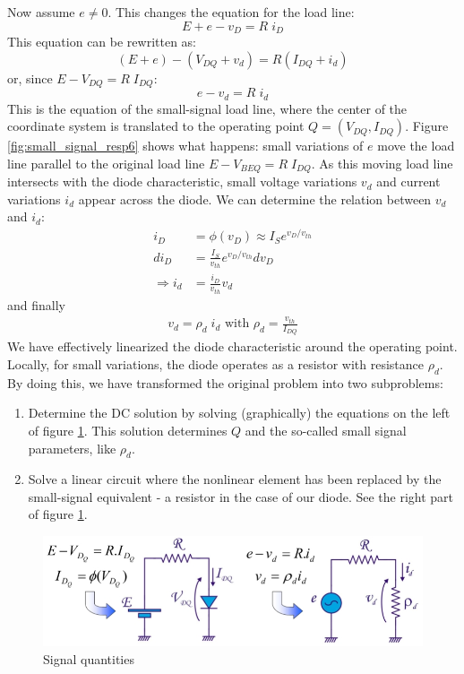 Now assume $e \ne 0$. This changes the equation for the load line:
\begin{equation}
	E+e - v_D = R\;i_D
\end{equation}
This equation can be rewritten as:
$$
(E+e) - (V_{DQ} + v_d) = R (I_{DQ} + i_d)
$$
or, since $E - V_{DQ} = R\;I_{DQ} $:
\begin{equation}
	e - v_d = R\;i_d
\end{equation}
This is the equation of the small-signal load line, where the center of the coordinate system is translated to the operating point $Q = (V_{DQ}, I_{DQ})$. Figure \ref{fig:small_signal_resp6} shows what happens: small variations of $e$ move the load line parallel to the original load line $E - V_{BEQ} = R\;I_{DQ}$. As this moving load line intersects with the diode characteristic, small voltage variations $v_d$ and current variations $i_d$ appear across the diode. We can determine the relation between $v_d$ and $i_d$:
\begin{equation}
	\begin{split}
		i_D  &= \phi(v_D) \approx I_S e^{v_D/v_{th}}\\
		di_D &= \frac{I_S}{v_{th}}  e^{v_D/v_{th}} dv_D \\
\Rightarrow	i_d  &= \frac{i_D}{v_{th}} v_d
	\end{split}
\end{equation}
and finally
\begin{equation}
	\begin{split}
		v_d = \rho_d\;i_d \text{ with } \rho_d = \frac{v_{th}}{I_{DQ}}
	\end{split}
\end{equation}
We have effectively linearized the diode characteristic around the operating point. Locally, for small variations, the diode operates as a resistor with resistance $\rho_d$.\\
By doing this, we have transformed the original problem into two subproblems:
\begin{enumerate}
	\item Determine the DC solution by solving (graphically) the equations on the left of figure \ref{fig:small_signal_resp7}.	This solution determines $Q$ and the so-called small signal parameters, like $\rho_d$.
	\item Solve a linear circuit where the nonlinear element has been replaced by the small-signal equivalent - a resistor in the case of our diode. See the right part of figure \ref{fig:small_signal_resp7}.
\end{enumerate}
\begin{figure}[h!]
	\centering
	\includegraphics[width=12cm]{figures/ch02/small_signal_resp7.jpg}
	\caption{Signal quantities}
	\label{fig:small_signal_resp7}
\end{figure}

